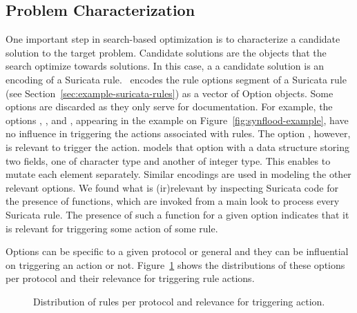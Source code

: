 \documentclass[conference]{IEEEtran}
\begin{document}

\subsection{Problem Characterization}

One important step in search-based optimization is to characterize a
candidate solution to the target problem. Candidate solutions are the
objects that the search optimize towards solutions. In this case, a a
candidate solution is an encoding of a Suricata rule.  \tname\ encodes
the rule options segment of a Suricata rule (see
Section~\ref{sec:example-suricata-rules}) as a vector of Option
objects. Some options are discarded as they only serve for
documentation. For example, the options ,
, and , appearing in the
example on Figure~\ref{fig:synflood-example}, have no influence in
triggering the actions associated with rules. The option
, however, is relevant to trigger the action. \tname{}
models that option with a data structure storing two fields, one of
character type and another of integer type. This enables \tname{} to
mutate each element separately. Similar encodings are used in modeling
the other relevant options. We found what is (ir)relevant by
inspecting Suricata code for the presence of  functions,
which are invoked from a main look to process every Suricata rule. The
presence of such a function for a given option indicates that it is
relevant for triggering some action of some rule.

Options can be specific to a given protocol or general and they can be
influential on triggering an action or
not. Figure~\ref{fig:distribution-rules-protocol} shows the
distributions of these options per protocol and their relevance for
triggering rule actions.

\pgfplotsset{width=5.5cm,compat=1.8}
\begin{figure}[h!]
  \centering
  \caption{\label{fig:distribution-rules-protocol}Distribution of
    rules per protocol and relevance for triggering action.}
\end{figure}
\end{document}
